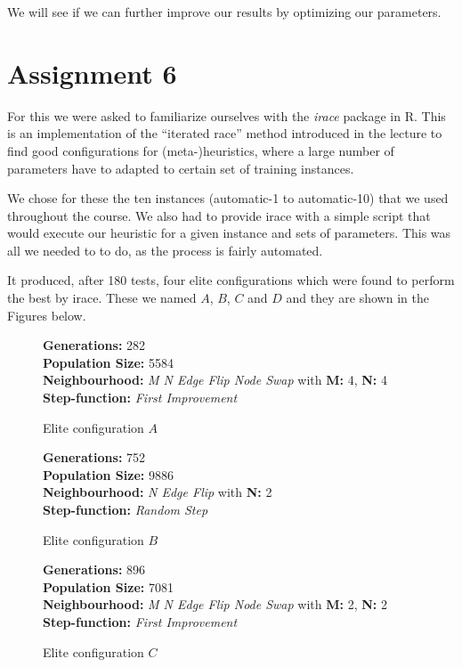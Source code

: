 \documentclass [11pt]{article}
\begin{document}
We will see if we can further improve our results by optimizing our parameters.

\newpage

\section{Assignment 6}


For this we were asked to familiarize ourselves with the \emph{irace} package in R. This is an implementation of the ``iterated race'' method introduced in the lecture to find good configurations for (meta-)heuristics, where a large number of parameters have to adapted to certain set of training instances. 

We chose for these the ten instances (automatic-1 to automatic-10) that we used throughout the course. We also had to provide irace with a simple script that would execute our heuristic for a given instance and sets of parameters. This was all we needed to to do, as the process is fairly automated. 

It produced, after 180 tests, four elite configurations which were found to perform the best by irace. These we  named $A$, $B$, $C$ and $D$ and they are shown in the Figures below. 


\begin{figure}[H]
  \textbf{Generations:} 282 \\
\textbf{Population Size:} 5584 \\
\textbf{Neighbourhood:} \emph{M N Edge Flip Node Swap} with \textbf{M:} 4, \textbf{N:} 4\\
\textbf{Step-function:} \emph{First Improvement} 
\caption{Elite configuration $A$}
\end{figure}


\begin{figure}[H]
  \textbf{Generations:} 752 \\
\textbf{Population Size:} 9886 \\
\textbf{Neighbourhood:} \emph{N Edge Flip } with \textbf{N:} 2\\
\textbf{Step-function:} \emph{Random Step} 
\caption{Elite configuration $B$}
\end{figure}



\begin{figure}[H]
  \textbf{Generations:} 896 \\
\textbf{Population Size:} 7081 \\
\textbf{Neighbourhood:} \emph{M N Edge Flip Node Swap} with \textbf{M:} 2, \textbf{N:} 2\\
\textbf{Step-function:} \emph{First Improvement} 
\caption{Elite configuration $C$}
\end{figure}
\end{document}
